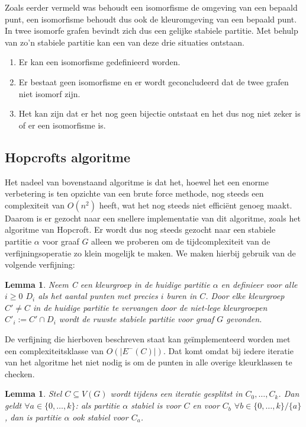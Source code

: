 \documentclass[twoside]{article}
\newtheorem{lemma}[theorem]{Lemma}
\begin{document}
\begin{multicols}{2}
Zoals eerder vermeld was behoudt een isomorfisme de omgeving van een bepaald punt, een isomorfisme behoudt dus ook de kleuromgeving van een bepaald punt. In twee isomorfe grafen bevindt zich dus een gelijke stabiele partitie. Met behulp van zo'n stabiele partitie kan een van deze drie situaties ontstaan.
\begin{enumerate}
\item Er kan een isomorfisme gedefinieerd worden.
\item Er bestaat geen isomorfisme en er wordt geconcludeerd dat  de twee grafen niet isomorf zijn.
\item Het kan zijn dat er het nog geen bijectie ontstaat en het dus nog niet zeker is of er een isomorfisme is.
\end{enumerate}

\subsection{Hopcrofts algoritme}
Het nadeel van bovenstaand algoritme is dat het, hoewel het een enorme verbetering is ten opzichte van een brute force methode, nog steeds een complexiteit van $O(n^2)$ heeft, wat het nog steeds niet efficiënt genoeg maakt. Daarom is er gezocht naar een snellere implementatie van dit algoritme, zoals het algoritme van Hopcroft. Er wordt dus nog steeds gezocht naar een stabiele partitie $\alpha$ voor graaf $G$ alleen we proberen om de tijdcomplexiteit van de verfijningsoperatie zo klein mogelijk te maken. We maken hierbij gebruik van de volgende verfijning:

\begin{lemma}
Neem C een kleurgroep in de huidige partitie $\alpha$ en definieer voor alle $i \geq 0$ $D_{i}$ als het aantal punten met precies $i$ buren in $C$. Door elke kleurgroep $C' \neq C$ in de huidige partitie te vervangen door de niet-lege kleurgroepen $C'_{i} := C'\cap D_{i}$ wordt de ruwste stabiele partitie voor graaf $G$ gevonden.
\cite{slides_DFA}
\end{lemma}

De verfijning die hierboven beschreven staat kan ge\"implementeerd worden met een complexiteitsklasse van $O(|E^{-}(C)|)$. Dat komt omdat bij iedere iteratie van het algoritme het niet nodig is om de punten in alle overige kleurklassen te checken.

\begin{lemma}
Stel $C \subseteq V(G)$ wordt tijdens een iteratie gesplitst in $C_{0}, \ldots, C_{k}$. Dan geldt $\forall a \in \{0,\ldots,k\}$: als partitie $\alpha$ stabiel is voor $C$ en voor $C_{b}$ $\forall b \in \{0,\ldots,k\}/\{a\}$, dan is partitie $\alpha$ ook stabiel voor $C_{a}$.
\end{lemma}


\end{multicols}
\end{document}
